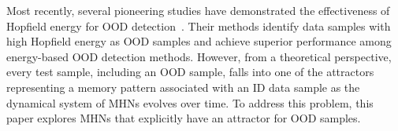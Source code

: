 Most recently, several pioneering studies have demonstrated the effectiveness of Hopfield energy for OOD detection~\cite{zhang23she, Hofmann2024boosting}.
Their methods identify data samples with high Hopfield energy as OOD samples and achieve superior performance among energy-based OOD detection methods.
However, from a theoretical perspective, every test sample, including an OOD sample, falls into one of the attractors representing a memory pattern associated with an ID data sample as the dynamical system of MHNs evolves over time.
To address this problem, this paper explores MHNs that explicitly have an attractor for OOD samples.